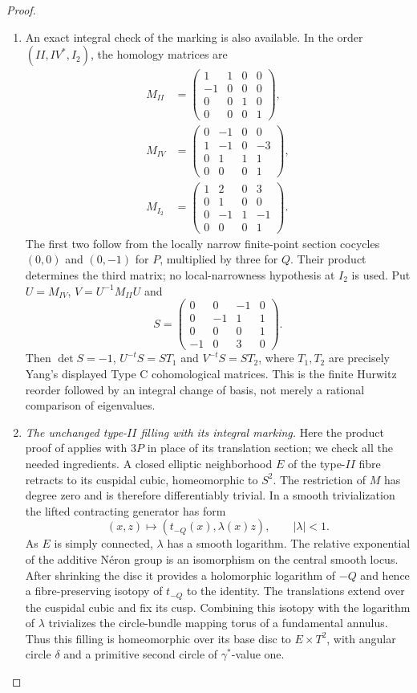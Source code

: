 \begin{proof}
\begin{enumerate}[label=\arabic*.,leftmargin=*]
\item An exact integral check of the marking is also available.
In the order $(II,IV^*,I_2)$, the homology matrices are
\[
 \begin{split}
 M_{II}&=\begin{pmatrix}1&1&0&0\\-1&0&0&0\\0&0&1&0\\0&0&0&1\end{pmatrix},\\
 M_{IV}&=\begin{pmatrix}0&-1&0&0\\1&-1&0&-3\\0&1&1&1\\0&0&0&1\end{pmatrix},\\
 M_{I_2}&=\begin{pmatrix}1&2&0&3\\0&1&0&0\\0&-1&1&-1\\0&0&0&1\end{pmatrix}.
 \end{split}
\]
The first two follow from the locally narrow finite-point
section cocycles $(0,0)$ and $(0,-1)$ for $P$, multiplied by
three for $Q$. Their product determines the third matrix;
no local-narrowness hypothesis at $I_2$ is used.
Put $U=M_{IV}$, $V=U^{-1}M_{II}U$ and
\[
 S=\begin{pmatrix}
 0&0&-1&0\\0&-1&1&1\\0&0&0&1\\-1&0&3&0
 \end{pmatrix}.
\]
Then $\det S=-1$, $U^{-t}S=ST_1$ and $V^{-t}S=ST_2$,
where $T_1,T_2$ are precisely Yang's displayed Type C
cohomological matrices. This is the finite Hurwitz reorder
followed by an integral change of basis, not merely a rational
comparison of eigenvalues.

\item \emph{The unchanged type-$II$ filling with its integral marking.}
Here the product proof of \cite[Lemma 3.10]{manLR26} applies
with $3P$ in place of its translation section; we check all the
needed ingredients. A closed elliptic neighborhood $E$ of the
type-$II$ fibre retracts to its cuspidal cubic, homeomorphic to
$S^2$. The restriction of $M$ has degree zero and is therefore
differentiably trivial. In a smooth trivialization the lifted
contracting generator has form
\[
 (x,z)\longmapsto(t_{-Q}(x),\lambda(x)z),\qquad |\lambda|<1.
\]
As $E$ is simply connected, $\lambda$ has a smooth logarithm.
The relative exponential of the additive N\'eron group is an
isomorphism on the central smooth locus. After shrinking the
disc it provides a holomorphic logarithm of $-Q$ and hence a
fibre-preserving isotopy of $t_{-Q}$ to the identity.
The translations extend over the cuspidal cubic and fix its
cusp. Combining this isotopy with the logarithm of $\lambda$
trivializes the circle-bundle mapping torus of a fundamental
annulus. Thus this filling is homeomorphic over its base disc
to $E\times T^2$, with angular circle $\delta$ and a primitive
second circle of $\gamma^*$-value one.


\end{enumerate}
\end{proof}

